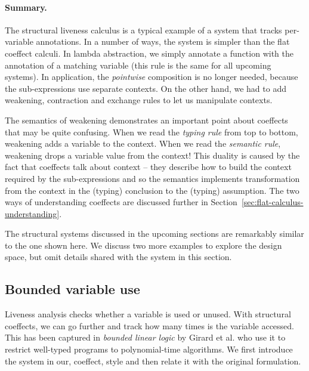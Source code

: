\begin{figure}[t]
\vspace{-0.5em}
\label{fig:applications-struct-livesem}
\end{figure}
\vspace{-0.5em}


\paragraph{Summary.}
The structural liveness calculus is a typical example of a system that tracks per-variable
annotations. In a number of ways, the system is simpler than the flat coeffect calculi. In
lambda abstraction, we simply annotate a function with the annotation of a matching variable
(this rule is the same for all upcoming systems). In application, the \emph{pointwise} composition
is no longer needed, because the sub-expressions use separate contexts. On the other hand,
we had to add weakening, contraction and exchange rules to let us manipulate contexts.

The semantics of weakening demonstrates an important point about coeffects that may be quite
confusing. When we read the \emph{typing rule} from top to bottom, weakening adds a variable
to the context. When we read the \emph{semantic rule}, weakening drops a variable value from the
context! This duality is caused by the fact that coeffects talk about context -- they describe
how to build the context required by the sub-expressions and so the semantics implements
transformation from the context in the (typing) conclusion to the (typing) assumption. The two
ways of understanding coeffects are discussed further in Section~\ref{sec:flat-calculus-understanding}.

The structural systems discussed in the upcoming sections are remarkably similar to the one
shown here. We discuss two more examples to explore the design space, but omit details shared with
the system in this section.


\subsection{Bounded variable use}
\label{sec:applications-struct-bll}

Liveness analysis checks whether a variable is used or unused. With structural coeffects, we can go
further and track how many times is the variable accessed. This has been captured in \emph{bounded 
linear logic} by Girard et al. \cite{logic-bounded} who use it to restrict well-typed programs to
polynomial-time algorithms. We first introduce the system in our, coeffect, style and then
relate it with the original formulation.

